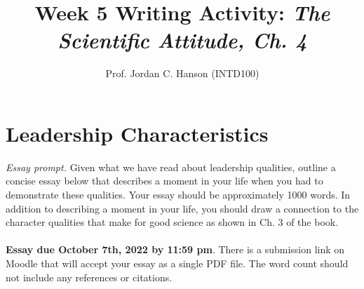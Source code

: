 \documentclass{article}
\begin{document}
\title{Week 5 Writing Activity: \textit{The Scientific Attitude, Ch. 4}}
\author{Prof. Jordan C. Hanson (INTD100)}

\maketitle

\section{Leadership Characteristics}
\noindent
\textit{Essay prompt.}  Given what we have read about leadership qualities, outline a concise essay below that describes a moment in your life when you had to demonstrate these qualities.  Your essay should be approximately 1000 words.  In addition to describing a moment in your life, you should draw a connection to the character qualities that make for good science as shown in Ch. 3 of the book. \\ \\
\noindent
\textbf{Essay due October 7th, 2022 by 11:59 pm}.  There is a submission link on Moodle that will accept your essay as a single PDF file.  The word count should not include any references or citations.
\end{document}
